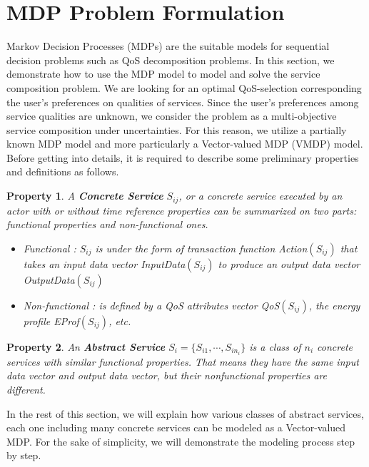 \documentclass[10pt,journal,compsoc]{IEEEtran}
\newtheorem{property}{Property}
\begin{document}



\section{MDP Problem Formulation}
 Markov Decision Processes (MDPs) are the suitable models for sequential decision problems such as QoS decomposition problems. In this section, we demonstrate how to use the MDP model to model and solve the service composition problem. We are looking for an optimal  QoS-selection corresponding the user's preferences on qualities of services. Since the user's preferences among service qualities are unknown, we consider the problem as a multi-objective service composition under uncertainties. For this reason, we utilize a partially known MDP model and more particularly a Vector-valued MDP (VMDP) model.  Before getting into details, it is required to describe some preliminary properties and definitions as follows. 

\begin{property}
A \textbf{Concrete Service} $S_{ij}$, or a concrete service executed by an actor with or without time reference properties can be summarized on two parts: functional properties and non-functional ones.

\begin{itemize}
\item Functional : $S_{ij}$ is under the form of transaction function Action$(S_{ij})$ that takes an input data vector InputData$(S_{ij})$ to produce an output data vector OutputData$(S_{ij})$ 
\item Non-functional : is defined by a QoS attributes vector QoS$(S_{ij})$, the energy profile EProf$(S_{ij})$, etc.  
\end{itemize}

\end{property}

\begin{property}
An \textbf{Abstract Service} $S_i = \{ S_{i1}, \cdots, S_{in_i} \}$ is a class of $n_i$ concrete services with similar functional properties. That means they have the same input data vector and output data vector, but their nonfunctional properties are different. 
\end{property}
In the rest of this section, we will explain how various classes of abstract services, each one including many concrete services can be modeled as a Vector-valued MDP. For the sake of simplicity, we will demonstrate the modeling process step by step. 
\end{document}
